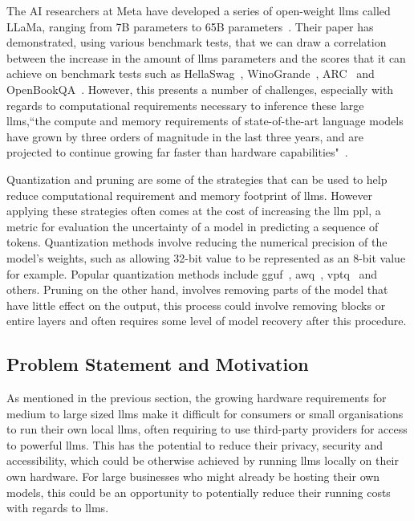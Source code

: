 \documentclass{ifacconf}
\begin{document}
	The AI researchers at Meta have developed a series of open-weight \glspl{llm} called LLaMa, ranging from 7B parameters to 65B parameters~\cite{touvron2023llamaopenefficientfoundation}. Their paper has demonstrated, using various benchmark tests, that we can draw a correlation between the increase in the amount of \glspl{llm} parameters and the scores that it can achieve on benchmark tests such as HellaSwag~\cite{zellers2019hellaswagmachinereallyfinish}, WinoGrande~\cite{sakaguchi2019winograndeadversarialwinogradschema}, ARC~\cite{clark2018thinksolvedquestionanswering} and OpenBookQA~\cite{mihaylov2018suitarmorconductelectricity}. However, this presents a number of challenges, especially with regards to computational requirements necessary to inference these large \glspl{llm},``the compute and memory requirements of state-of-the-art language models have grown by three orders of magnitude in the last three years, and are projected to continue growing far faster than hardware capabilities"~\cite[p.~97]{bommasani2022opportunitiesrisksfoundationmodels}.
	
	Quantization and pruning are some of the strategies that can be used to help reduce computational requirement and memory footprint of \glspl{llm}. However applying these strategies often comes at the cost of increasing the \gls{llm} \gls{ppl}, a metric for evaluation the uncertainty of a model in predicting a sequence of tokens. Quantization methods involve reducing the numerical precision of the model's weights, such as allowing 32-bit value to be represented as an 8-bit value for example. Popular quantization methods include \gls{gguf}~\cite{llamacpp, ggml}, \gls{awq}~\cite{lin2024awqactivationawareweightquantization}, \gls{vptq}~\cite{liu2024vptqextremelowbitvector} and others. Pruning on the other hand, involves removing parts of the model that have little effect on the output, this process could involve removing blocks or entire layers and often requires some level of model recovery after this procedure.
	
	\subsection{Problem Statement and Motivation}
	
	As mentioned in the previous section, the growing hardware requirements for medium to large sized  \glspl{llm} make it difficult for consumers or small organisations to run their own local  \glspl{llm}, often requiring to use third-party providers for access to powerful  \glspl{llm}. This has the potential to reduce their privacy, security and accessibility, which could be otherwise achieved by running \glspl{llm} locally on their own hardware. For large businesses who might already be hosting their own models, this could be an opportunity to potentially reduce their running costs with regards to \glspl{llm}.
	
\end{document}
